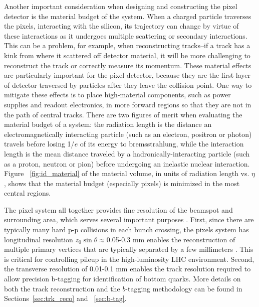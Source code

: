 Another important consideration when designing and constructing the pixel detector is the material budget of the system.  When a 
charged particle traverses the pixels, interacting with the silicon, its trajectory can change by virtue of these interactions 
as it undergoes multiple scattering or secondary interactions.  This can be a problem, for example, when reconstructing 
tracks--if a track has a kink from where it scattered off detector material, it will be more 
challenging to reconstruct the track or correctly measure its momentum.  These material effects are particularly important for the pixel 
detector, because they are the first layer of detector traversed by particles after they leave the collision point.  
One way to mitigate these effects is to place high-material components, such as power supplies and readout 
electronics, in more forward regions so that they are not in the path of central tracks.  There are 
two figures of merit when evaluating the material budget of a system: the radiation length is the distance an 
electromagnetically interacting particle (such as an electron, positron or photon) travels before losing 1/$e$ 
of its energy to bremsstrahlung, while the interaction length is the mean distance traveled by a hadronically-interacting 
particle (such as a proton, neutron or pion) before undergoing an inelastic nuclear interaction.  Figure ~\ref{fig:id_material} 
of the material volume, in units of radiation length vs. $\eta$, shows that the material budget 
(especially pixels) is minimized in the most central regions.


The pixel system all together provides fine resolution of the beamspot and surrounding area, which serves several important purposes
.  First, since there are typically many hard p-p collisions in each bunch crossing, the pixels 
system has longitudinal resolution $z_0\sin\theta\approx$0.05-0.3 mm 
enables the reconstruction of multiple primary vertices that are typically separated by a few millimeters \cite{pixel_res}.  This 
is critical for controlling pileup in the high-luminosity LHC environment.  Second, the transverse resolution of 0.01-0.1 mm 
enables the track resolution required to allow precision b-tagging for identification of bottom quarks.  More details
on both the track reconstruction and the $b$-tagging methodology can be found in Sections~\ref{sec:trk_reco} and ~\ref{sec:b-tag}. 


